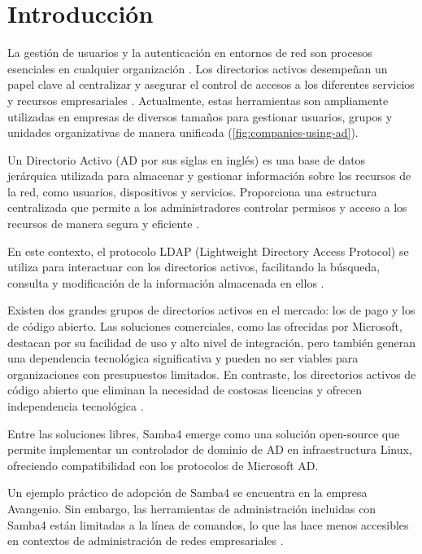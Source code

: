 \section{Introducción}

La gestión de usuarios y la autenticación en entornos de red son procesos esenciales en cualquier organización \autocite{thakur_user_2015-1, josang_local_2015, kizza_access_2024}. Los directorios activos desempeñan un papel clave al centralizar y asegurar el control de accesos a los diferentes servicios y recursos empresariales \autocite{kizza_access_2024}. Actualmente, estas herramientas son ampliamente utilizadas en empresas de diversos tamaños para gestionar usuarios, grupos y unidades organizativas de manera unificada (\autoref{fig:companies-using-ad}).

Un Directorio Activo (AD por sus siglas en inglés) es una base de datos jerárquica utilizada para almacenar y gestionar información sobre los recursos de la red, como usuarios, dispositivos y servicios. Proporciona una estructura centralizada que permite a los administradores controlar permisos y acceso a los recursos de manera segura y eficiente  \autocite{harrison_lightweight_2006,thakur_user_2015,carter_ldap_2003}. 

En este contexto, el protocolo LDAP (Lightweight Directory Access Protocol) se utiliza para interactuar con los directorios activos, facilitando la búsqueda, consulta y modificación de la información almacenada en ellos \autocite{harrison_lightweight_2006,sermersheim_lightweight_2006,bartlett_samba_2005,voglmaier_abcs_2003,redhat_what_2022,janice_ldap_2023}.

Existen dos grandes grupos de directorios activos en el mercado: los de pago y los de código abierto. Las soluciones comerciales, como las ofrecidas por Microsoft, destacan por su facilidad de uso y alto nivel de integración, pero también generan una dependencia tecnológica significativa y pueden no ser viables para organizaciones con presupuestos limitados. En contraste, los directorios activos de código abierto que eliminan la necesidad de costosas licencias y ofrecen independencia tecnológica \autocite{thakur_user_2015-1,bartlett_samba_2005,imanudin_active_2019}.

Entre las soluciones libres, Samba4 emerge como una solución open-source que permite implementar un controlador de dominio de AD en infraestructura Linux, ofreciendo compatibilidad con los protocolos de Microsoft AD. 

Un ejemplo práctico de adopción de Samba4 se encuentra en la empresa Avangenio. Sin embargo, las herramientas de administración incluidas con Samba4 están limitadas a la línea de comandos, lo que las hace menos accesibles en contextos de administración de redes empresariales \autocite{bartlett_samba_2005,imanudin_active_2019,samba_what_2019}.


